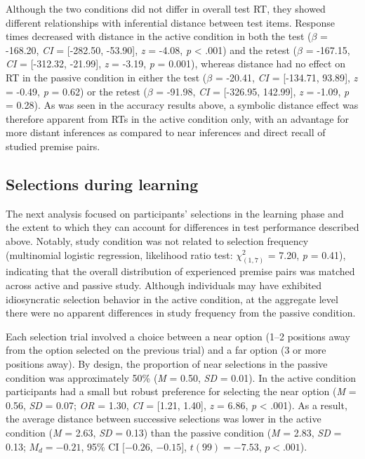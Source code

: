\documentclass[floatsintext,man]{apa6}
\theoremstyle{definition}
\theoremstyle{definition}
\theoremstyle{definition}
\theoremstyle{remark}
\begin{document}
Although the two conditions did not differ in overall test RT, they
showed different relationships with inferential distance between test
items. Response times decreased with distance in the active condition in
both the test (\(\beta\) = -168.20, \emph{CI} = {[}-282.50, -53.90{]},
\emph{z} = -4.08, \emph{p} \textless{} .001) and the retest (\(\beta\) =
-167.15, \emph{CI} = {[}-312.32, -21.99{]}, \emph{z} = -3.19, \emph{p} =
0.001), whereas distance had no effect on RT in the passive condition in
either the test (\(\beta\) = -20.41, \emph{CI} = {[}-134.71, 93.89{]},
\emph{z} = -0.49, \emph{p} = 0.62) or the retest (\(\beta\) = -91.98,
\emph{CI} = {[}-326.95, 142.99{]}, \emph{z} = -1.09, \emph{p} = 0.28).
As was seen in the accuracy results above, a symbolic distance effect
was therefore apparent from RTs in the active condition only, with an
advantage for more distant inferences as compared to near inferences and
direct recall of studied premise pairs.

\subsection{Selections during
learning}\label{selections-during-learning}

The next analysis focused on participants' selections in the learning
phase and the extent to which they can account for differences in test
performance described above. Notably, study condition was not related to
selection frequency (multinomial logistic regression, likelihood ratio
test: \(\chi_{(1,7)}^2\) = 7.20, \emph{p} = 0.41), indicating that the
overall distribution of experienced premise pairs was matched across
active and passive study. Although individuals may have exhibited
idiosyncratic selection behavior in the active condition, at the
aggregate level there were no apparent differences in study frequency
from the passive condition.

Each selection trial involved a choice between a near option (1--2
positions away from the option selected on the previous trial) and a far
option (3 or more positions away). By design, the proportion of near
selections in the passive condition was approximately 50\% (\emph{M} =
0.50, \emph{SD} = 0.01). In the active condition participants had a
small but robust preference for selecting the near option (\emph{M} =
0.56, \emph{SD} = 0.07; \emph{OR} = 1.30, \emph{CI} = {[}1.21, 1.40{]},
\emph{z} = 6.86, \emph{p} \textless{} .001). As a result, the average
distance between successive selections was lower in the active condition
(\emph{M} = 2.63, \emph{SD} = 0.13) than the passive condition (\emph{M}
= 2.83, \emph{SD} = 0.13; \(M_d = -0.21\), 95\% CI \([-0.26\),
\(-0.15]\), \(t(99) = -7.53\), \(p < .001\)).
\end{document}
